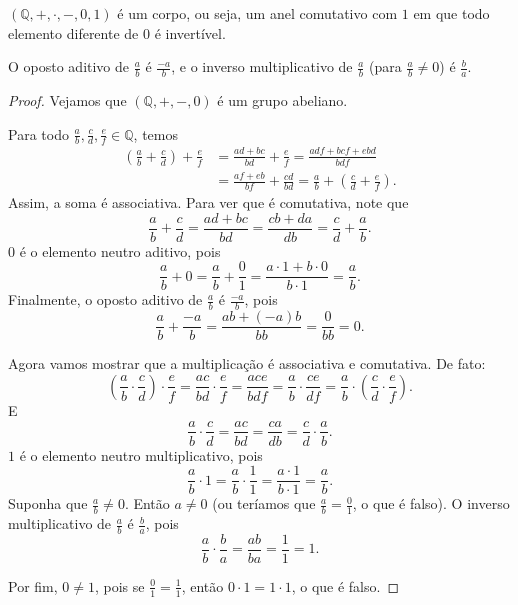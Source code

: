 \begin{proposition}
    $(\mathbb Q, +, \cdot, -, 0, 1)$ é um corpo, ou seja, um anel comutativo com $1$ em que todo elemento diferente de $0$ é invertível.

    O oposto aditivo de $\frac{a}{b}$ é $\frac{-a}{b}$, e o inverso multiplicativo de $\frac{a}{b}$ (para $\frac{a}{b}\neq 0$) é $\frac{b}{a}$.
\end{proposition}
\begin{proof}
    Vejamos que $(\mathbb Q, +, -, 0)$ é um grupo abeliano.
    
    Para todo $\frac{a}{b}, \frac{c}{d}, \frac{e}{f}\in\mathbb Q$, temos
    \begin{align*}
        \left(\frac{a}{b}+\frac{c}{d}\right)+\frac{e}{f} &= \frac{ad+bc}{bd}+\frac{e}{f} = \frac{adf+bcf+ebd}{bdf}\\
        &= \frac{af+eb}{bf}+\frac{cd}{bd} = \frac{a}{b}+\left(\frac{c}{d}+\frac{e}{f}\right).
    \end{align*}
    Assim, a soma é associativa.
    Para ver que é comutativa, note que
    \[
        \frac{a}{b}+\frac{c}{d} = \frac{ad+bc}{bd} = \frac{cb+da}{db} = \frac{c}{d}+\frac{a}{b}.
    \]
    $0$ é o elemento neutro aditivo, pois
    \[
        \frac{a}{b}+0 = \frac{a}{b}+\frac{0}{1} = \frac{a\cdot 1 + b\cdot 0}{b\cdot 1} = \frac{a}{b}.
    \]
    Finalmente, o oposto aditivo de $\frac{a}{b}$ é $\frac{-a}{b}$, pois
    \[
        \frac{a}{b}+\frac{-a}{b} = \frac{ab+(-a)b}{bb} = \frac{0}{bb} = 0.
    \]

    Agora vamos mostrar que a multiplicação é associativa e comutativa.
    De fato:
    \[
        \left(\frac{a}{b}\cdot\frac{c}{d}\right)\cdot\frac{e}{f} = \frac{ac}{bd}\cdot\frac{e}{f} = \frac{ace}{bdf} = \frac{a}{b}\cdot\frac{ce}{df} = \frac{a}{b}\cdot\left(\frac{c}{d}\cdot\frac{e}{f}\right).
    \]
    E
    \[
        \frac{a}{b}\cdot\frac{c}{d} = \frac{ac}{bd} = \frac{ca}{db} = \frac{c}{d}\cdot\frac{a}{b}.
    \]
    $1$ é o elemento neutro multiplicativo, pois
    \[
        \frac{a}{b}\cdot 1 = \frac{a}{b}\cdot\frac{1}{1} = \frac{a\cdot 1}{b\cdot 1} = \frac{a}{b}.
    \]
    Suponha que $\frac{a}{b}\neq 0$.
    Então $a\neq 0$ (ou teríamos que $\frac{a}{b}=\frac{0}{1}$, o que é falso).
    O inverso multiplicativo de $\frac{a}{b}$ é $\frac{b}{a}$, pois
    \[
        \frac{a}{b}\cdot\frac{b}{a} = \frac{ab}{ba} = \frac{1}{1} = 1.
    \]

    Por fim, $0\neq 1$, pois se $\frac{0}{1}=\frac{1}{1}$, então $0\cdot 1 = 1\cdot 1$, o que é falso.
\end{proof}

